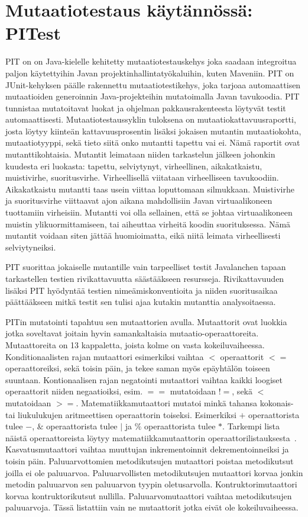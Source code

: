 \documentclass{tktltiki}
\begin{document}
\section{Mutaatiotestaus käytännössä: PITest}
PIT on on Java-kielelle kehitetty mutaatiotestauskehys joka saadaan integroitua paljon käytettyihin Javan projektinhallintatyökaluihin, kuten Maveniin. PIT on JUnit-kehyksen päälle rakennettu mutaatiotestikehys, joka tarjoaa automaattisen mutaatioiden generoinnin Java-projekteihin mutatoimalla Javan tavukoodia. PIT tunnistaa mutatoitavat luokat ja ohjelman pakkausrakenteesta löytyvät testit automaattisesti. Mutaatiotestaussyklin tuloksena on mutaatiokattavuusraportti, josta löytyy kiinteän kattavuusprosentin lisäksi jokaisen mutantin mutaatiokohta, mutaatiotyyppi, sekä tieto siitä onko mutantti tapettu vai ei. Nämä raportit ovat mutanttikohtaisia. Mutantit leimataan niiden tarkastelun jälkeen johonkin kuudesta eri luokasta: tapettu, selviytynyt, virheellinen, aikakatkaistu, muistivirhe, suoritusvirhe. Virheellisellä viitataan virheelliseen tavukoodiin. Aikakatkaistu mutantti taas usein viittaa loputtomaan silmukkaan. Muistivirhe ja suoritusvirhe viittaavat ajon aikana mahdollisiin Javan virtuaalikoneen tuottamiin virheisiin. Mutantti voi olla sellainen, että se johtaa virtuaalikoneen muistin ylikuormittamiseen, tai aiheuttaa virheitä koodin suorituksessa. Nämä mutantit voidaan siten jättää huomioimatta, eikä niitä leimata virheellisesti selviytyneiksi.

PIT suorittaa jokaiselle mutantille vain tarpeelliset testit Javalanchen tapaan tarkastellen testien rivikattavuutta säästääkseen resursseja. Rivikattavuuden lisäksi PIT hyödyntää testien nimeämiskonventioita ja niiden suoritusaikaa päättääkseen mitkä testit sen tulisi ajaa kutakin mutanttia analysoitaessa.

PITin mutatointi tapahtuu sen mutaattorien avulla. Mutaattorit ovat luokkia jotka soveltavat joitain hyvin samankaltaisia mutaatio-operaattoreita. Mutaattoreita on 13 kappaletta, joista kolme on vasta kokeiluvaiheessa. Konditionaalisten rajan mutaattori esimerkiksi vaihtaa $<$ operaattorit $<=$ operaattoreiksi, sekä toisin päin, ja tekee saman myös epäyhtälön toiseen suuntaan. Kontionaalisen rajan negatointi mutaattori vaihtaa kaikki loogiset operaattorit niiden negaatioiksi, esim. $==$ mutatoidaan $!=$, sekä $<$ mutatoidaan $>=$. Matematiikkamutaattori mutatoi minkä tahansa kokonais- tai liukulukujen aritmeettisen operaattorin toiseksi. Esimerkiksi $+$ operaattorista tulee $-$, $\&$ operaattorista tulee $|$ ja $\%$ operaattorista tulee $*$. Tarkempi lista näistä operaattoreista löytyy matematiikkamutaattorin operaattorilistauksesta~\cite{}. Kasvatusmutaattori vaihtaa muuttujan inkrementoinnit dekrementoinneiksi ja toisin päin. Paluuarvottomien metodikutsujen mutaattori poistaa metodikutsut joilla ei ole paluuarvoa. Paluuarvollisten metodikutsujen mutaattori korvaa jonkin metodin paluuarvon sen paluuarvon tyypin oletusarvolla. Kontruktorimutaattori korvaa kontruktorikutsut nullilla. Paluuarvomutaattori vaihtaa metodikutsujen paluuarvoja. Tässä listattiin vain ne mutaattorit jotka eivät ole kokeiluvaiheessa.
\end{document}
